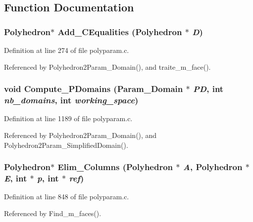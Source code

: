\subsection{Function Documentation}
\subsubsection{\setlength{\rightskip}{0pt plus 5cm}Polyhedron$\ast$ Add\_\-CEqualities (Polyhedron $\ast$ {\em D})\hspace{0.3cm}{\tt  [static]}}\label{polyparam_8c_a25}




Definition at line 274 of file polyparam.c.

Referenced by Polyhedron2Param\_\-Domain(), and traite\_\-m\_\-face().

\subsubsection{\setlength{\rightskip}{0pt plus 5cm}void Compute\_\-PDomains (Param\_\-Domain $\ast$ {\em PD}, int {\em nb\_\-domains}, int {\em working\_\-space})}\label{polyparam_8c_a34}




Definition at line 1189 of file polyparam.c.

Referenced by Polyhedron2Param\_\-Domain(), and Polyhedron2Param\_\-Simplified\-Domain().

\subsubsection{\setlength{\rightskip}{0pt plus 5cm}Polyhedron$\ast$ Elim\_\-Columns (Polyhedron $\ast$ {\em A}, Polyhedron $\ast$ {\em E}, int $\ast$ {\em p}, int $\ast$ {\em ref})}\label{polyparam_8c_a32}




Definition at line 848 of file polyparam.c.

Referenced by Find\_\-m\_\-faces().

